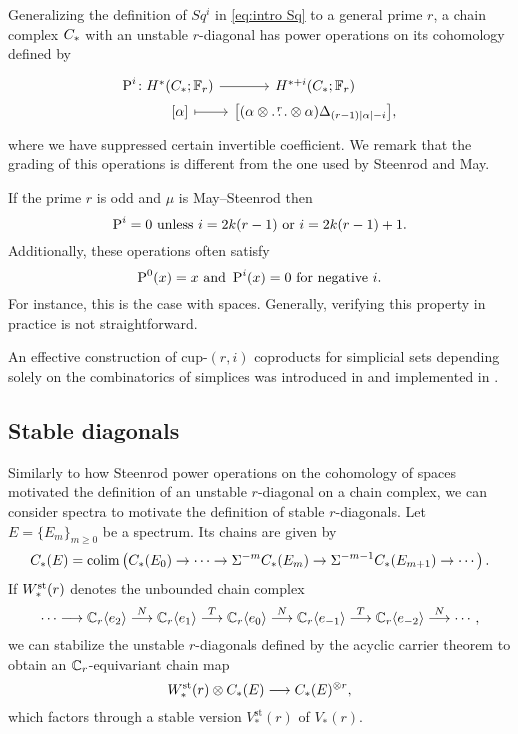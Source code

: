 Generalizing the definition of $Sq^i$ in \cref{eq:intro Sq} to a general prime $r$, a chain complex $C_{*}$ with an unstable $r$-diagonal has power operations on its cohomology defined by
\begin{equation}\label{eq:intro P}
	\begin{tikzcd}[column sep=tiny, row sep=0]
		\power^i \colon &[-15pt] H^*(\ucadenas;\bF_r) \arrow[r] & H^{*+i}(\ucadenas;\bF_r) \\
		& {[\alpha]} \arrow[r, mapsto] & \big{[}(\alpha \ot \overset{r}{\dots} \ot \alpha)\Delta_{(r-1)\bars{\alpha}-i}\big{]},
	\end{tikzcd}
\end{equation}
where we have suppressed certain invertible coefficient.
We remark that the grading of this operations is different from the one used by Steenrod and May.

If the prime $r$ is odd and $\mu$ is May--Steenrod then
\[
\operatorname{P}^i = 0 \text{ unless } i = 2k(r-1) \text{ or }i = 2k(r-1)+1.
\]
Additionally, these operations often satisfy
\[
\operatorname{P}^0(x) = x \text{ and }\operatorname{P}^i(x) = 0 \text{ for negative } i.
\]
For instance, this is the case with spaces.
Generally, verifying this property in practice is not straightforward.

An effective construction of cup-$(r,i)$ coproducts for simplicial sets depending solely on the combinatorics of simplices was introduced in \cite{medina2021may_st} and implemented in \cite{medina2021comch}.

\subsection{Stable diagonals}

Similarly to how Steenrod power operations on the cohomology of spaces motivated the definition of an unstable $r$-diagonal on a chain complex, we can consider spectra to motivate the definition of stable $r$-diagonals.
Let $E = \{E_m\}_{m \geq 0}$ be a spectrum. Its chains are given by
\[
C_{*}(E) = \operatorname*{colim} \left(C_{*}(E_0) \to \dots \to \Sigma^{-m}C_{*}(E_m) \to \Sigma^{-m-1} C_{*}(E_{m+1}) \to \dotsb\right).
\]
If $W^{\mathrm{st}}_{*}(r)$ denotes the unbounded chain complex
\[
\dotsb \longrightarrow \mathbb{C}_r\langle e_2\rangle \overset{N}{\longrightarrow}
\mathbb{C}_r\langle e_1\rangle \overset{T}{\longrightarrow}
\mathbb{C}_r\langle e_0\rangle \overset{N}{\longrightarrow}
\mathbb{C}_r\langle e_{-1}\rangle \overset{T}{\longrightarrow}
\mathbb{C}_r\langle e_{-2}\rangle \overset{N}{\longrightarrow}
\dotsb,
\]
we can stabilize the unstable $r$-diagonals defined by the acyclic carrier theorem to obtain an $\mathbb{C}_r$-equivariant chain map
\[
W^{\mathrm{st}}_{*}(r) \otimes C_{*}(E) \longrightarrow C_{*}(E)^{\otimes r},
\]
which factors through a stable version $V_*^\mathrm{st}(r)$ of $V_*(r)$.

